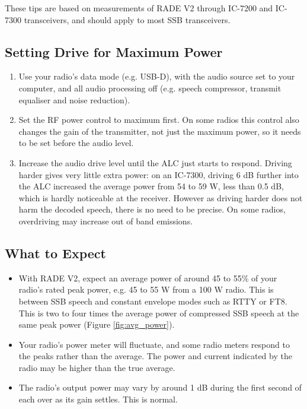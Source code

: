\documentclass{article}
\begin{document}
These tips are based on measurements of RADE V2 through IC-7200 and IC-7300 transceivers, and should apply to most SSB transceivers.

\subsection{Setting Drive for Maximum Power}

\begin{enumerate}
\item Use your radio's data mode (e.g. USB-D), with the audio source set to your computer, and all audio processing off (e.g. speech compressor, transmit equaliser and noise reduction).
\item Set the RF power control to maximum first.  On some radios this control also changes the gain of the transmitter, not just the maximum power, so it needs to be set before the audio level.
\item Increase the audio drive level until the ALC just starts to respond.  Driving harder gives very little extra power: on an IC-7300, driving 6 \si{dB} further into the ALC increased the average power from 54 to 59 \si{W}, less than 0.5 \si{dB}, which is hardly noticeable at the receiver.  However as driving harder does not harm the decoded speech, there is no need to be precise.  On some radios, overdriving may increase out of band emissions.
\end{enumerate}

\subsection{What to Expect}

\begin{itemize}
\item With RADE V2, expect an average power of around 45 to 55\% of your radio's rated peak power, e.g. 45 to 55 \si{W} from a 100 \si{W} radio.  This is between SSB speech and constant envelope modes such as RTTY or FT8.  This is two to four times the average power of compressed SSB speech at the same peak power (Figure \ref{fig:avg_power}).
\item Your radio's power meter will fluctuate, and some radio meters respond to the peaks rather than the average.  The power and current indicated by the radio may be higher than the true average.
\item The radio's output power may vary by around 1 \si{dB} during the first second of each over as its gain settles.  This is normal.
\end{itemize}
\end{document}

